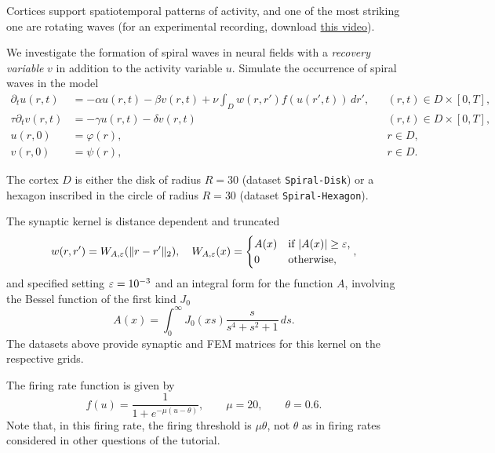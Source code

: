 \documentclass[a4paper]{siamonline220329}
\theoremstyle{plain}
\begin{document}
\begin{question}\label{question:spiral}
  Cortices support spatiotemporal patterns of activity, and one of the most striking one are rotating waves
  \cite{huangSpiralWavesDisinhibited2004a} (for an experimental recording, download
  \href{https://www.jneurosci.org/highwire/filestream/597325/field_highwire_adjunct_files/4/spiral-s3081907-4500-6775.mpg}{this
  video}). 

  We investigate the formation of spiral waves in neural fields with a \textit{recovery variable}
  $v$ in addition to the activity variable $u$. Simulate the occurrence of spiral
  waves in the model
 \begin{equation*}
   \begin{aligned}
     \partial_{t} u(r,t) & = -\alpha u(r,t) -\beta v(r,t) + \nu \int_{D} w(r,r')
     f(u(r',t))\,d r',
       && (r,t) \in D \times [0,T], \\
     \tau \partial_{t} v(r,t) & = -\gamma u(r,t) -\delta v(r,t) 
       && (r,t) \in D \times [0,T], \\
     u(r,0) & = \varphi(r),
       && r \in D, \\
     v(r,0) & = \psi(r),
       && r \in D.
   \end{aligned}
 \end{equation*}

  The cortex $D$ is either the disk of radius $R = 30$ (dataset
  \lstinline|Spiral-Disk|) or a hexagon inscribed in the circle of radius $R=30$
  (dataset \lstinline|Spiral-Hexagon|).

  The synaptic kernel is distance dependent and truncated
  \[
    w(r,r') = W_{A,\varepsilon}(\| r - r' \|_2), 
    \quad 
    W_{A,\varepsilon}(x) = 
    \begin{cases}
      A(x) & \text{if $|A(x)|  \geq \varepsilon $,} \\
      0    & \text{otherwise,} 
    \end{cases},
  \]
  and specified setting $\varepsilon=10^{-3}$ and an integral form for the function $A$,
  involving the Bessel function of the first kind $J_0$
  \[
   A(x) = \int_{0}^{\infty} J_0(xs) \frac{s}{s^4+s^2+1}\,d s.
  \]
  The datasets above provide synaptic and FEM matrices for this kernel on the
  respective grids.

  The firing rate function is given by
  \[
  f(u) = \frac{1}{1+e^{-\mu(u-\theta)}},  \qquad \mu =20, \qquad \theta = 0.6.
  \]
  Note that, in this firing rate, the firing threshold is $\mu \theta$, not $\theta$ as
  in firing rates considered in other questions of the tutorial.


\end{question}
\end{document}
